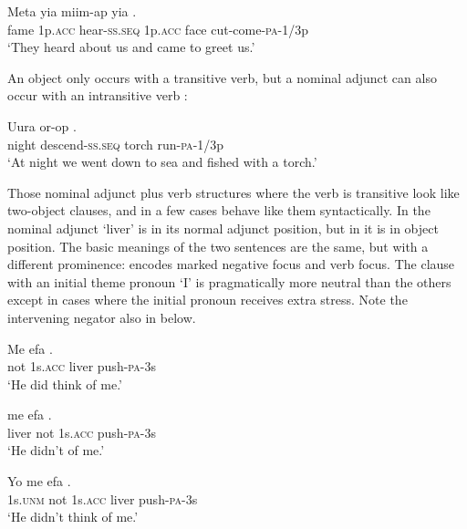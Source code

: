 \ea%
\label{ex:3:x450}
\gll Meta yia miim-ap yia  . \\
fame 1p.\textsc{acc} hear-\textsc{ss}.\textsc{seq} 1p.\textsc{acc} face cut-come-\textsc{pa}-1/3p\\
\glt`They heard about us and came to greet us.'
\z

An object  only occurs with a transitive verb, but a nominal adjunct can also occur with an intransitive verb :

\ea%
\label{ex:3:x451}
\gll Uura or-op  . \\
night descend-\textsc{ss}.\textsc{seq} torch run-\textsc{pa}-1/3p\\
\glt`At night we went down to sea and fished with a torch.'
\z

Those nominal adjunct plus verb structures where the verb is transitive look like two-object clauses, and in a few cases behave like them syntactically. In  the nominal adjunct  `liver' is in its normal adjunct position, but in  it is in object  position. The basic meanings of the two sentences are the same, but with a different prominence:  encodes marked negative focus and  verb focus. The clause  with an initial theme pronoun  `I' is pragmatically more neutral than the others except in cases where the initial pronoun receives extra stress. Note the intervening negator also in  below. 

\ea%
\label{ex:3:x452}
\gll Me efa  . \\
not 1s.\textsc{acc} liver push-\textsc{pa}-3s\\
\glt`He did  think of me.'
\z

\ea%
\label{ex:3:x453}
\gll {} me efa . \\
liver not 1s.\textsc{acc} push-\textsc{pa}-3s\\
\glt`He didn't  of me.'
\z

\ea%
\label{ex:3:x1874}
\gll Yo me efa  . \\
1s.\textsc{unm} not 1s.\textsc{acc} liver push-\textsc{pa}-3s\\
\glt`He didn't think of me.'
\z

